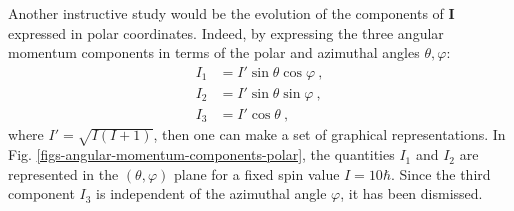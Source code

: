 Another instructive study would be the evolution of the components of $\mathbf{I}$ expressed in polar coordinates. Indeed, by expressing the three angular momentum components in terms of the polar and azimuthal angles $\theta,\varphi$:
\begin{align}
    I_1&=I'\sin\theta\cos\varphi\ ,\\
    I_2&=I'\sin\theta\sin\varphi\ ,\\
    I_3&=I'\cos\theta\ ,
    \label{angular-momentum-polar-components}
\end{align}
where $I'=\sqrt{I(I+1)}$, then one can make a set of graphical representations. In Fig. \ref{figs-angular-momentum-components-polar}, the quantities $I_1$ and $I_2$ are represented in the $(\theta,\varphi)$ plane for a fixed spin value $I=10\hbar$. Since the third component $I_3$ is independent of the azimuthal angle $\varphi$, it has been dismissed.
